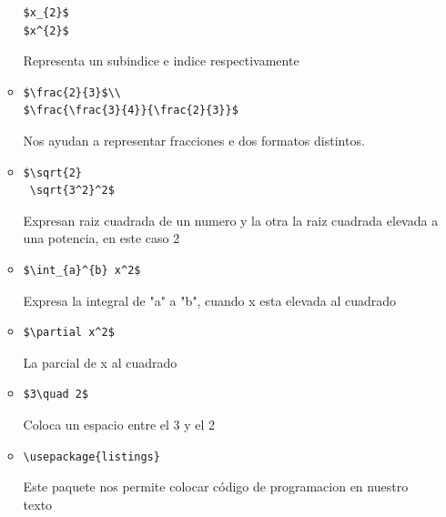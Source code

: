 \documentclass[letterpaper, 12pt, oneside]{article}%
\begin{document}
\begin{enumerate}
\begin{itemize}
			\begin{lstlisting}  
$x_{2}$
$x^{2}$
			\end{lstlisting}  Representa un subindice e indice respectivamente
			\item 
			\begin{lstlisting}  
$\frac{2}{3}$\\
$\frac{\frac{3}{4}}{\frac{2}{3}}$
			\end{lstlisting} Nos ayudan a representar fracciones e dos formatos distintos.
			\item
			\begin{lstlisting}  
$\sqrt{2} 
 \sqrt{3^2}^2$
			\end{lstlisting} Expresan raiz cuadrada de un numero y la otra la raiz cuadrada elevada a una potencia, en este caso 2
			\item
			\begin{lstlisting} 
$\int_{a}^{b} x^2$
			\end{lstlisting} Expresa la integral de "a" a "b", cuando x esta elevada al cuadrado
			\item
			\begin{lstlisting}  
$\partial x^2$
			\end{lstlisting} La parcial de x al cuadrado
			\item
			\begin{lstlisting} 
$3\quad 2$ 			
			\end{lstlisting} Coloca un espacio entre el 3 y el 2
			\item
			\begin{lstlisting} 
\usepackage{listings}			
			\end{lstlisting} Este paquete nos permite colocar código de programacion en nuestro texto
			
			
			
			
			
		\end{itemize}
		
		
		
		
	\end{enumerate}%
	
	
	
\end{document}
